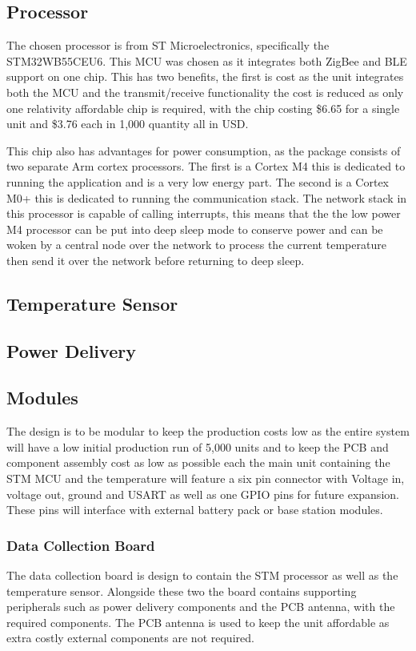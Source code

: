 \documentclass{article}
\begin{document}
\subsection{Processor}
The chosen processor is from ST Microelectronics, specifically the STM32WB55CEU6. This MCU was 
chosen as it integrates both ZigBee and BLE support on one chip. This has two benefits, the first 
is cost as the unit integrates both the MCU and the transmit/receive functionality the cost is 
reduced as only one relativity affordable chip is required, with the chip costing \$6.65 for a 
single unit and \$3.76 each in 1,000 quantity all in USD.

This chip also has advantages for power consumption, as the package consists of two separate Arm
cortex processors. The first is a Cortex M4 this is dedicated to running the application and is a
very low energy part. The second is a Cortex M0+ this is dedicated to running the communication
stack. The network stack in this processor is capable of calling interrupts, this means that the
the low power M4 processor can be put into deep sleep mode to conserve power and can be woken by a
central node over the network to process the current temperature then send it over the network
before returning to deep sleep. 

\subsection{Temperature Sensor}

\subsection{Power Delivery}

\subsection{Modules}
The design is to be modular to keep the production costs low as the entire system will have a low
initial production run of 5,000 units and to keep the PCB and component assembly cost as low as
possible each the main unit containing the STM MCU and the temperature will feature a six pin
connector with Voltage in, voltage out, ground and USART as well as one GPIO pins for future 
expansion. These pins will interface with external battery pack or base station modules.

\subsubsection{Data Collection Board}
The data collection board is design to contain the STM processor as well as the temperature 
sensor. Alongside these two the board contains supporting peripherals such as power delivery
components and the PCB antenna, with the required components. The PCB antenna is used to keep the
unit affordable as extra costly external components are not required.
\end{document}
